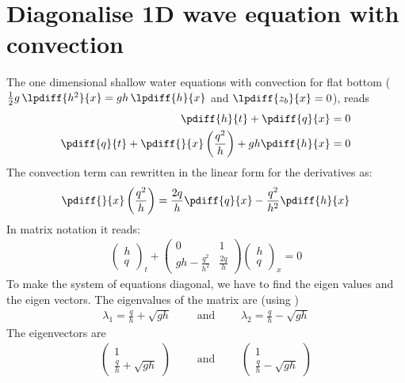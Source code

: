 \chapter{Diagonalise 1D wave equation with convection}\label{sec:diagonalise_conservative_wave_with_convection}

The one dimensional shallow water equations  with convection
for flat bottom ($\half g\, \lpdiff{h^2}{x} = gh\, \lpdiff{h}{x}$ and $\lpdiff{z_b}{x} = 0$), reads
%
\begin{align}
    \pdiff{h}{t}  + \pdiff{q}{x} & = 0 \\
    \pdiff{q}{t}  + \pdiff{}{x} \left( \frac{q^2}{h} \right) + g h \pdiff{h}{x} & = 0
\end{align}
The convection term can rewritten in the linear form for the derivatives as:
\begin{align}
    \pdiff{}{x} \left( \frac{q^2}{h} \right) = \frac{2 q}{h} \pdiff{q}{x} - \frac{q^2}{h^2}\pdiff{h}{x}
    \label{eq:convection_linear_form}
\end{align}
In matrix notation it reads:
\begin{align}
    \left( \begin{matrix} h \\ q \end{matrix}  \right)_t +
    \left( \begin{matrix} 0 & 1  \\ gh-\frac{q^2}{h^2} & \frac{2q}{h} \end{matrix}  \right)
    \left( \begin{matrix} h \\ q \end{matrix} \right)_x = 0
\end{align}
To make the system of equations diagonal, we have to find the eigen values and the eigen vectors.
The eigenvalues of the matrix are (using \maplesoft)
\begin{align}
    \lambda_1 = \frac{q}{h} + \sqrt{gh} \qquad \mbox{ and } \qquad
    \lambda_2 = \frac{q}{h} - \sqrt{gh}
\end{align}
The eigenvectors are
\begin{align}
    \begin{pmatrix} 1 \\ \frac{q}{h} + \sqrt{gh} \end{pmatrix}  \qquad \mbox{ and } \qquad
    \begin{pmatrix} 1 \\ \frac{q}{h} - \sqrt{gh} \end{pmatrix}
\end{align}
